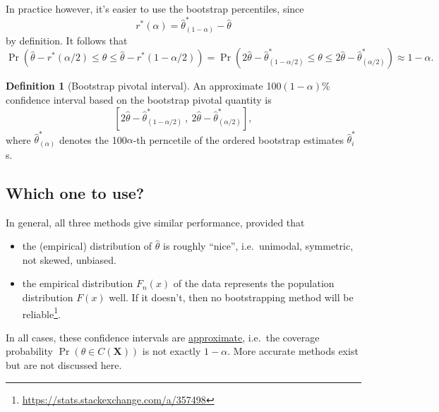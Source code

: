 \documentclass[
]{book}
\newcommand{\bX}{{\boldsymbol X}}
\theoremstyle{definition}
\newtheorem{definition}{Definition}[chapter]
\theoremstyle{definition}
\theoremstyle{definition}
\theoremstyle{definition}
\theoremstyle{remark}
\begin{document}
In practice however, it's easier to use the bootstrap percentiles, since
\[
r^*(\alpha) = \hat\theta^*_{(1-\alpha)} - \hat\theta
\]
by definition. It follows that
\[
\Pr\left(\hat\theta - r^*(\alpha/2) \leq \theta \leq \hat\theta - r^*(1-\alpha/2) \right) = \Pr\left(2\hat\theta - \hat\theta^*_{(1-\alpha/2)} \leq \theta \leq 2\hat\theta - \hat\theta^*_{(\alpha/2)} \right) \approx 1-\alpha.
\]

\begin{definition}[Bootstrap pivotal interval]
An approximate 100\((1-\alpha)\)\% confidence interval based on the bootstrap pivotal quantity is
\[
\left[ 2\hat\theta - \hat\theta^*_{(1-\alpha/2)} \ , \ 2\hat\theta - \hat\theta^*_{(\alpha/2)} \right],
\]
where \(\hat\theta^*_{(\alpha)}\) denotes the 100\(\alpha\)-th perncetile of the ordered bootstrap estimates \(\hat\theta_i^*\)s.
\end{definition}

\hypertarget{which-one-to-use}{%
\subsection{Which one to use?}\label{which-one-to-use}}

In general, all three methods give similar performance, provided that

\begin{itemize}
\item
  the (empirical) distribution of \(\hat\theta\) is roughly ``nice'', i.e.~unimodal, symmetric, not skewed, unbiased.
\item
  the empirical distribution \(F_n(x)\) of the data represents the population distribution \(F(x)\) well. If it doesn't, then no bootstrapping method will be reliable\footnote{\url{https://stats.stackexchange.com/a/357498}}.
\end{itemize}

In all cases, these confidence intervals are \underline{approximate}, i.e.~the coverage probability \(\Pr(\theta \in C(\bX))\) is not exactly \(1-\alpha\). More accurate methods exist but are not discussed here.
\end{document}
